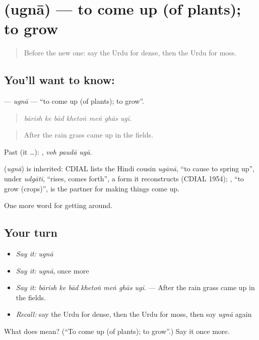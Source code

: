 \section[\texorpdfstring{\ur{اگنا} (ugnā)}{اگنا (ugnā)}]{ (ugnā) — to come up (of plants); to grow}

\label{lesson:UR-C437-ugna}



\begin{quote}
Before the new one: say the Urdu for dense, then the Urdu for moss.
\end{quote}

\subsection*{You'll want to know: }
\textbf{} — \emph{ugnā} — \textquotedblleft{}to come up (of plants); to grow\textquotedblright{}.

\begin{quote}
      
\end{quote}

\begin{quote}
\emph{bārish ke bād khetoṅ meṅ ghās ugī.}
\end{quote}

\begin{quote}
After the rain grass came up in the fields.
\end{quote}

Past (it …):   , \emph{voh paudā ugā}.

\begin{cousinweb}
\textbf{} (\emph{ugnā}) is inherited: CDIAL lists the Hindi cousin \emph{ugānā}, \textquotedblleft{}to cause to spring up\textquotedblright{}, under \emph{udgāti}, \textquotedblleft{}rises, comes forth\textquotedblright{}, a form it reconstructs (CDIAL 1954); \textbf{}, \textquotedblleft{}to grow (crops)\textquotedblright{}, is the partner for making things come up.
\end{cousinweb}

\begin{grammarlens}[title={What you've built}]
One more word for getting around.
\end{grammarlens}

\subsection*{Your turn}
\begin{itemize}
\raggedright
  \item \emph{Say it:} \emph{ugnā}
  \item \emph{Say it:} \emph{ugnā}, once more
  \item \emph{Say it:} \emph{bārish ke bād khetoṅ meṅ ghās ugī.} — After the rain grass came up in the fields.
  \item \emph{Recall:} say the Urdu for dense, then the Urdu for moss, then say \emph{ugnā} again
\end{itemize}

\begin{tcolorbox}[breakable,colback=teal!4,colframe=teal!35!black,title={Before you move on}]
What does  mean? (\textquotedblleft{}To come up (of plants); to grow\textquotedblright{}.) Say it once more.
\end{tcolorbox}
